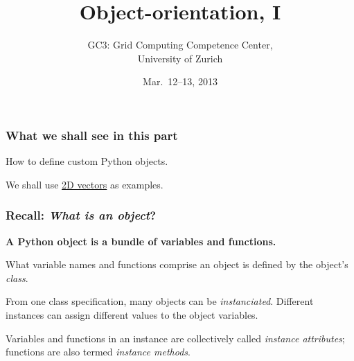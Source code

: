 \documentclass[english,serif,mathserif,xcolor=pdftex,dvipsnames,table]{beamer}
\title[OOP 1]{%
  Object-orientation, I
}
\author[GC3]{%
  GC3: Grid Computing Competence Center, \\
  University of Zurich
}
\date{Mar.~12--13, 2013}
\begin{document}
\maketitle


\begin{frame}
  \frametitle{What we shall see in this part}

  How to define custom Python objects.

  \+
  We shall use \href{http://jccc-mpg.wikidot.com/vectors}{2D
    vectors} as examples.
\end{frame}


\begin{frame}
  \frametitle{Recall: \emph{What is an object}?}
  \textbf{A Python object is a bundle of variables and functions.}

  \+
  What variable names and functions comprise an object is defined
  by the object's \emph{class}.

  \+
  From one class specification, many objects can be
  \emph{instanciated}.  Different instances can assign different
  values to the object variables.

  \+
  Variables and functions in an instance are collectively called
  \emph{instance attributes}; functions are also termed \emph{instance
    methods}.
\end{frame}
\end{document}
